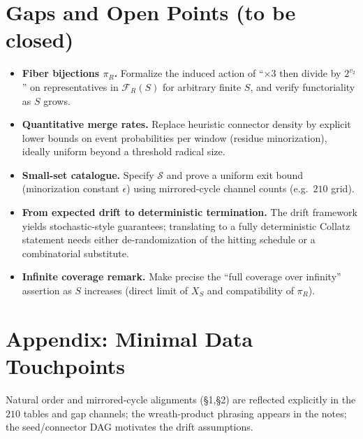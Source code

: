 \documentclass[11pt]{article}
\begin{document}
\section{Gaps and Open Points (to be closed)}
\begin{itemize}
  \item \textbf{Fiber bijections $\pi_R$.} Formalize the induced action of ``$\times 3$ then divide by $2^{v_2}$'' on representatives in $\mathcal F_R(S)$ for arbitrary finite $S$, and verify functoriality as $S$ grows. %
  \item \textbf{Quantitative merge rates.} Replace heuristic connector density by explicit lower bounds on event probabilities per window (residue minorization), ideally uniform beyond a threshold radical size. %
  \item \textbf{Small-set catalogue.} Specify $\mathcal S$ and prove a uniform exit bound (minorization constant $\epsilon$) using mirrored-cycle channel counts (e.g.\ $210$ grid). %
  \item \textbf{From expected drift to deterministic termination.} The drift framework yields stochastic-style guarantees; translating to a fully deterministic Collatz statement needs either de-randomization of the hitting schedule or a combinatorial substitute.
  \item \textbf{Infinite coverage remark.} Make precise the ``full coverage over infinity'' assertion as $S$ increases (direct limit of $X_S$ and compatibility of $\pi_R$).
\end{itemize}

\section*{Appendix: Minimal Data Touchpoints}
Natural order and mirrored-cycle alignments (\S1,\S2) are reflected explicitly in the $210$ tables and gap channels; the wreath-product phrasing appears in the notes; the seed/connector DAG motivates the drift assumptions.
\end{document}
